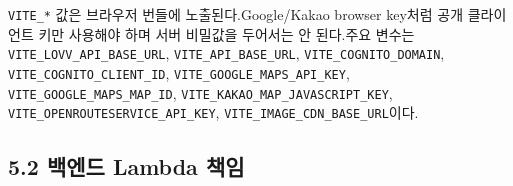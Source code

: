 \documentclass[12pt,a4paper]{article}
\newcommand{\DocNeedspace}[1]{\par\ifdim\dimexpr\pagegoal-\pagetotal\relax<#1\newpage\fi}
\begin{document}
\DocNeedspace{3\baselineskip}
\texttt{VITE\_\allowbreak{}*} 값은 브라우저 번들에 노출된다.\newline Google/Kakao browser key처럼 공개 클라이언트 키만 사용해야 하며 서버 비밀값을 두어서는 안 된다.\newline 주요 변수는 \texttt{VITE\_\allowbreak{}LOVV\_\allowbreak{}API\_\allowbreak{}BASE\_\allowbreak{}URL}, \texttt{VITE\_\allowbreak{}API\_\allowbreak{}BASE\_\allowbreak{}URL}, \texttt{VITE\_\allowbreak{}COGNITO\_\allowbreak{}DOMAIN}, \texttt{VITE\_\allowbreak{}COGNITO\_\allowbreak{}CLIENT\_\allowbreak{}ID}, \texttt{VITE\_\allowbreak{}GOOGLE\_\allowbreak{}MAPS\_\allowbreak{}API\_\allowbreak{}KEY}, \texttt{VITE\_\allowbreak{}GOOGLE\_\allowbreak{}MAPS\_\allowbreak{}MAP\_\allowbreak{}ID}, \texttt{VITE\_\allowbreak{}KAKAO\_\allowbreak{}MAP\_\allowbreak{}JAVASCRIPT\_\allowbreak{}KEY}, \texttt{VITE\_\allowbreak{}OPENROUTESERVICE\_\allowbreak{}API\_\allowbreak{}KEY}, \texttt{VITE\_\allowbreak{}IMAGE\_\allowbreak{}CDN\_\allowbreak{}BASE\_\allowbreak{}URL}이다.


\DocNeedspace{24\baselineskip}
\subsection*{5.2 백엔드 Lambda 책임}
\end{document}
